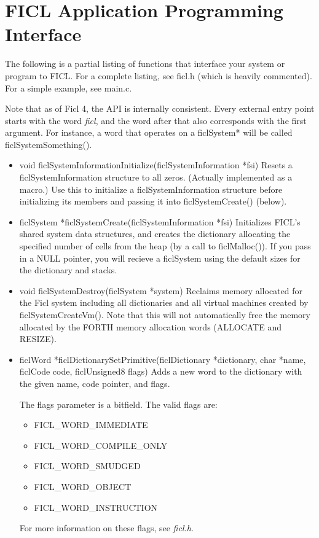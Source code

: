 \section{FICL Application Programming Interface}
The following is a partial listing of functions that interface your
system or program to FICL. For a complete listing, see ficl.h (which is
heavily commented). For a simple example, see main.c.

Note that as of Ficl 4, the API is internally consistent. Every external
entry point starts with the word \textit{ficl}, and the word after that
also corresponds with the first argument. For instance, a word that
operates on a ficlSystem* will be called ficlSystemSomething().
\begin{itemize}[noitemsep]
	\item void ficlSystemInformationInitialize(ficlSystemInformation
		*fsi)\newline
	Resets a ficlSystemInformation structure to all zeros. (Actually
	implemented as a macro.) Use this to initialize a
	ficlSystemInformation structure before initializing its members
	and passing it into ficlSystemCreate() (below).

	\item ficlSystem *ficlSystemCreate(ficlSystemInformation
		*fsi)\newline
	Initializes FICL's shared system data structures, and creates
	the dictionary allocating the specified number of cells from the
	heap (by a call to ficlMalloc()). If you pass in a NULL pointer,
	you will recieve a ficlSystem using the default sizes for the
	dictionary and stacks.

	\item void ficlSystemDestroy(ficlSystem *system)\newline
	Reclaims memory allocated for the Ficl system including all
	dictionaries and all virtual machines created by
	ficlSystemCreateVm(). Note that this will not automatically free
	the memory allocated by the FORTH memory allocation words
	(ALLOCATE and RESIZE).

	\item ficlWord *ficlDictionarySetPrimitive(ficlDictionary
		*dictionary, char *name, ficlCode code, ficlUnsigned8
		flags)\newline
	Adds a new word to the dictionary with the given name, code
	pointer, and flags.

	The flags parameter is a bitfield. The valid flags are:
	\begin{itemize}[noitemsep]
		\item FICL\_WORD\_IMMEDIATE
		\item FICL\_WORD\_COMPILE\_ONLY
		\item FICL\_WORD\_SMUDGED
		\item FICL\_WORD\_OBJECT
		\item FICL\_WORD\_INSTRUCTION
	\end{itemize}
	For more information on these flags, see \textit{ficl.h}.


\end{itemize}
